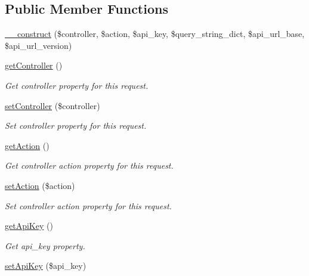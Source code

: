 \subsection*{Public Member Functions}
\begin{DoxyCompactItemize}
\item 
\hyperlink{classTune_1_1Management_1_1Service_1_1Request_a1919ae4173b6e9516342fd7f05a45e05}{\-\_\-\-\_\-construct} (\$controller, \$action, \$api\-\_\-key, \$query\-\_\-string\-\_\-dict, \$api\-\_\-url\-\_\-base, \$api\-\_\-url\-\_\-version)
\item 
\hyperlink{classTune_1_1Management_1_1Service_1_1Request_a9c80f380ce548e0b87a6eeeb53351d9d}{get\-Controller} ()
\begin{DoxyCompactList}\small\item\em Get controller property for this request. \end{DoxyCompactList}\item 
\hyperlink{classTune_1_1Management_1_1Service_1_1Request_ad4aeec47cf9c3f4a052a37cb3bbf2a78}{set\-Controller} (\$controller)
\begin{DoxyCompactList}\small\item\em Set controller property for this request. \end{DoxyCompactList}\item 
\hyperlink{classTune_1_1Management_1_1Service_1_1Request_afa3db0c503d14f86697d6fdb4dc3c017}{get\-Action} ()
\begin{DoxyCompactList}\small\item\em Get controller action property for this request. \end{DoxyCompactList}\item 
\hyperlink{classTune_1_1Management_1_1Service_1_1Request_ad9dea593d84e2037b48d835c81c0730b}{set\-Action} (\$action)
\begin{DoxyCompactList}\small\item\em Set controller action property for this request. \end{DoxyCompactList}\item 
\hyperlink{classTune_1_1Management_1_1Service_1_1Request_a550cda5702e07927c997ee64a0ce6649}{get\-Api\-Key} ()
\begin{DoxyCompactList}\small\item\em Get api\-\_\-key property. \end{DoxyCompactList}\item 
\hyperlink{classTune_1_1Management_1_1Service_1_1Request_a2a58e061109982ca77bd617e8d369ff2}{set\-Api\-Key} (\$api\-\_\-key)

\end{DoxyCompactItemize}

